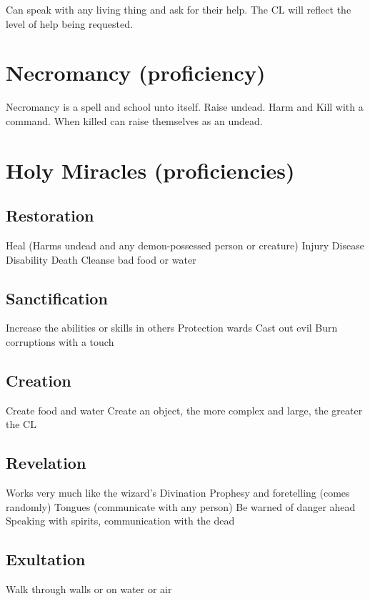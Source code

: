 Can speak with any living thing and ask for their help. The CL will reflect the level of help being requested.

\section{Necromancy (proficiency)}

Necromancy is a spell and school unto itself.
Raise undead.
Harm and Kill with a command.
When killed can raise themselves as an undead.

\section{Holy Miracles (proficiencies)}

\subsection{Restoration}

Heal (Harms undead and any demon-possessed person or creature)
Injury
Disease
Disability
Death
Cleanse bad food or water

\subsection{Sanctification}

Increase the abilities or skills in others
Protection wards
Cast out evil
Burn corruptions with a touch

\subsection{Creation}

Create food and water
Create an object, the more complex and large, the greater the CL

\subsection{Revelation}

Works very much like the wizard’s Divination
Prophesy and foretelling (comes randomly)
Tongues (communicate with any person)
Be warned of danger ahead
Speaking with spirits, communication with the dead

\subsection{Exultation}

Walk through walls or on water or air